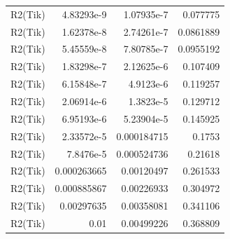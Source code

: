 \begin{tabular}{rrrr}
  R2(Tik) & 4.83293e-9 & 1.07935e-7 & 0.077775 \\
  R2(Tik) & 1.62378e-8 & 2.74261e-7 & 0.0861889 \\
  R2(Tik) & 5.45559e-8 & 7.80785e-7 & 0.0955192 \\
  R2(Tik) & 1.83298e-7 & 2.12625e-6 & 0.107409 \\
  R2(Tik) & 6.15848e-7 & 4.9123e-6 & 0.119257 \\
  R2(Tik) & 2.06914e-6 & 1.3823e-5 & 0.129712 \\
  R2(Tik) & 6.95193e-6 & 5.23904e-5 & 0.145925 \\
  R2(Tik) & 2.33572e-5 & 0.000184715 & 0.1753 \\
  R2(Tik) & 7.8476e-5 & 0.000524736 & 0.21618 \\
  R2(Tik) & 0.000263665 & 0.00120497 & 0.261533 \\
  R2(Tik) & 0.000885867 & 0.00226933 & 0.304972 \\
  R2(Tik) & 0.00297635 & 0.00358081 & 0.341106 \\
  R2(Tik) & 0.01 & 0.00499226 & 0.368809 \\
  \bottomrule
\end{tabular}
